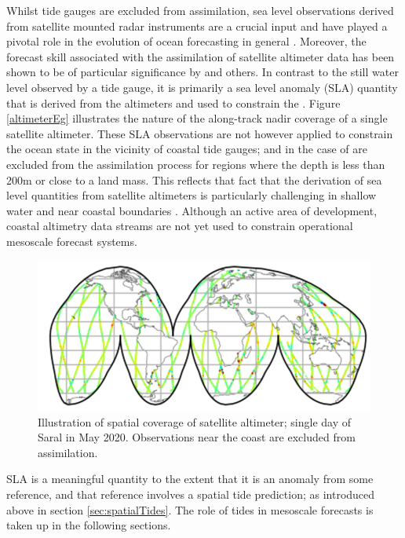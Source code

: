 Whilst tide gauges are excluded from assimilation, sea level observations derived from satellite mounted radar instruments are a crucial input and have played a pivotal role in the evolution of ocean forecasting in general \citep{Fu:2001ub}.  Moreover, the forecast skill associated with the assimilation of satellite altimeter data has been shown to be of particular significance by  \citep{10.5194/os-13-1077-2017} and others.
In contrast to the still water level observed by a tide gauge, it is primarily a sea level anomaly (SLA) quantity that is derived from the altimeters and used to constrain the \OGCM{}. Figure \ref{altimeterEg} illustrates the nature of the along-track nadir coverage of a single satellite altimeter.
These SLA observations are not however applied to constrain the ocean state in the vicinity of coastal tide gauges; and in the case of \BL{} are excluded from the assimilation process for regions where the depth is less than 200m or close to a land mass.   This reflects that fact that the derivation of sea level quantities from satellite altimeters is particularly challenging in shallow water and near coastal boundaries \citep{Woodworth:2011bf}.    Although an active area of development, coastal altimetry data streams are not yet used to constrain operational mesoscale forecast  systems.
\begin{figure}[h]\centering
  \includegraphics[width=\figwidthHalf]{figures/maps/altimeterCoverageEg.png}
  \caption{Illustration of spatial coverage of satellite altimeter; single day of Saral in May 2020. Observations near the coast are excluded from assimilation.}
  \label{fig:altimeterEg}
\end{figure}
SLA is a meaningful quantity to the extent that it is an anomaly from some reference, and that reference involves a spatial tide prediction; as introduced above in section \ref{sec:spatialTides}.
The role of tides in mesoscale forecasts is taken up in the following sections.

